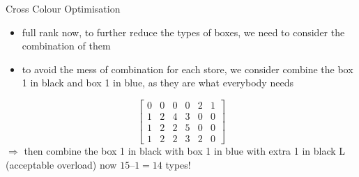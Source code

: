 \begin{frame}
	\begin{frame}{Cross Colour Optimisation}
	\begin{itemize}
	\item full rank now, to further reduce the types of boxes, we need to consider the combination of them
	\item to avoid the mess of combination for each store, we consider combine the box 1 in black and box 1 in blue, as they are what everybody needs
	\end{itemize}
    \begin{equation}
        \begin{bmatrix}
            0& 0& 0& 0& 2& 1\\
            1& 2& 4& 3& 0& 0 \\
             1& 2& 2& 5& 0& 0\\
             1& 2& 2& 3& 2& 0
        \end{bmatrix}
    \end{equation}
			$\Rightarrow$ then combine the box 1 in black with box 1 in blue with extra 1 in black L (acceptable overload)
now $15 – 1 = 14$ types!
	\end{frame}





\end{frame}
